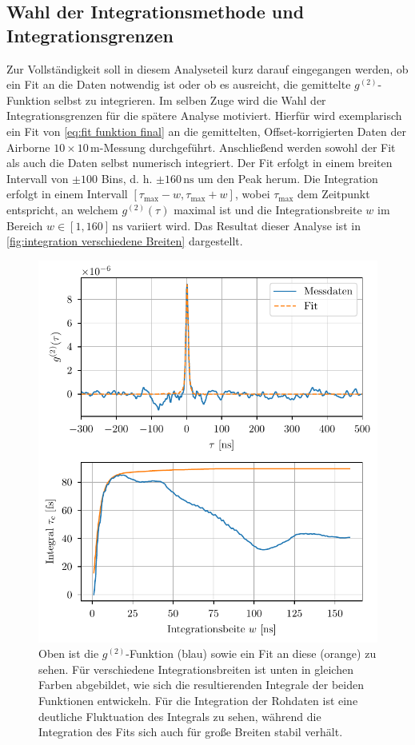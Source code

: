 \subsection{Wahl der Integrationsmethode und Integrationsgrenzen}
\label{ssec:Wahl der Integrationsmethode}
Zur Vollständigkeit soll in diesem Analyseteil kurz darauf eingegangen werden, ob ein Fit an die Daten notwendig ist oder ob es ausreicht, die gemittelte $g^{(2)}$-Funktion selbst zu integrieren. 
Im selben Zuge wird die Wahl der Integrationsgrenzen für die spätere Analyse motiviert. 
Hierfür wird exemplarisch ein Fit von \autoref{eq:fit funktion final} an die gemittelten, Offset-korrigierten Daten der Airborne $10\times 10\,\mathrm{m}$-Messung durchgeführt. 
Anschließend werden sowohl der Fit als auch die Daten selbst numerisch integriert. 
Der Fit erfolgt in einem breiten Intervall von $\pm 100$ Bins, d. h. $\pm 160\,\mathrm{ns}$ um den Peak herum. 
Die Integration erfolgt in einem Intervall $[\tau_{\mathrm{max}}-w, \tau_{\mathrm{max}}+w]$, wobei $\tau_{\mathrm{max}}$ dem Zeitpunkt entspricht, an welchem $g^{(2)}(\tau)$ maximal ist und die Integrationsbreite $w$ im Bereich $w\in [1,160]\,\mathrm{ns}$ variiert wird. 
Das Resultat dieser Analyse ist in \autoref{fig:integration verschiedene Breiten} dargestellt. 
\begin{figure}[hp]
    \centering
    \includegraphics{images/Analysis/integration_different_width.pdf}
    \caption{Oben ist die $g^{(2)}$-Funktion (blau) sowie ein Fit an diese (orange) zu sehen. Für verschiedene Integrationsbreiten ist unten in gleichen Farben abgebildet, wie sich die resultierenden Integrale der beiden Funktionen entwickeln. Für die Integration der Rohdaten ist eine deutliche Fluktuation des Integrals zu sehen, während die Integration des Fits sich auch für große Breiten stabil verhält.}
    \label{fig:integration verschiedene Breiten}
\end{figure}
